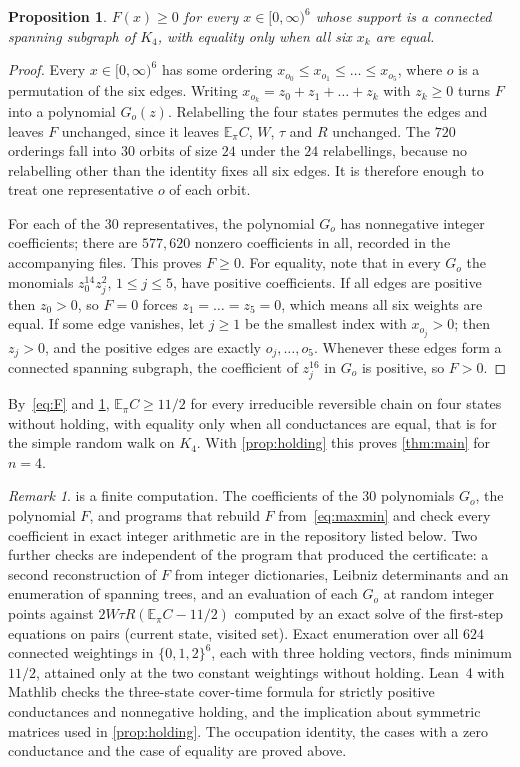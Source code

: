 \documentclass[11pt]{amsart}
\newtheorem{proposition}[theorem]{Proposition}
\theoremstyle{remark}
\newtheorem{remark}[theorem]{Remark}
\newcommand{\E}{\mathbb{E}}
\begin{document}
\begin{proposition}\label{prop:cones}
$F(x)\ge0$ for every $x\in[0,\infty)^6$ whose support is a connected spanning subgraph of $K_4$, with equality only
when all six $x_k$ are equal.
\end{proposition}

\begin{proof}
Every $x\in[0,\infty)^6$ has some ordering $x_{o_0}\le x_{o_1}\le\dots\le x_{o_5}$, where $o$ is a permutation of the
six edges. Writing $x_{o_k}=z_0+z_1+\dots+z_k$ with $z_k\ge0$ turns $F$ into a polynomial $G_o(z)$. Relabelling the
four states permutes the edges and leaves $F$ unchanged, since it leaves $\E_\pi C$, $W$, $\tau$ and $R$ unchanged. The
$720$ orderings fall into $30$ orbits of size $24$ under the $24$ relabellings, because no relabelling other than the
identity fixes all six edges. It is therefore enough to treat one representative $o$ of each orbit.

For each of the $30$ representatives, the polynomial $G_o$ has nonnegative integer coefficients; there are
$577{,}620$ nonzero coefficients in all, recorded in the accompanying files. This proves $F\ge0$. For equality, note that
in every $G_o$ the monomials $z_0^{14}z_j^2$, $1\le j\le5$, have positive coefficients. If all edges are positive then
$z_0>0$, so $F=0$ forces $z_1=\dots=z_5=0$, which means all six weights are equal. If some edge vanishes, let $j\ge1$ be
the smallest index with $x_{o_j}>0$; then $z_j>0$, and the positive edges are exactly $o_j,\dots,o_5$. Whenever these
edges form a connected spanning subgraph, the coefficient of $z_j^{16}$ in $G_o$ is positive, so $F>0$.
\end{proof}

By~\eqref{eq:F} and \cref{prop:cones}, $\E_\pi C\ge11/2$ for every irreducible reversible chain on four states without
holding, with equality only when all conductances are equal, that is for the simple random walk on $K_4$. With
\cref{prop:holding} this proves \cref{thm:main} for $n=4$.

\begin{remark}
 is a finite computation. The coefficients of the $30$ polynomials $G_o$, the polynomial $F$, and
programs that rebuild $F$ from~\eqref{eq:maxmin} and check every coefficient in exact integer arithmetic are in the
repository listed below. Two further checks are independent of the program that produced the certificate: a second
reconstruction of $F$ from integer dictionaries, Leibniz determinants and an enumeration of spanning trees, and an
evaluation of each $G_o$ at random integer points against $2W\tau R(\E_\pi C-11/2)$ computed by an exact solve of the
first-step equations on pairs (current state, visited set). Exact enumeration over all $624$ connected weightings in
$\{0,1,2\}^6$, each with three holding vectors, finds minimum $11/2$, attained only at the two constant weightings
without holding. Lean~4
with Mathlib checks the three-state cover-time formula for strictly positive conductances and nonnegative holding, and
the implication about symmetric matrices used in \cref{prop:holding}. The occupation identity, the cases with a zero
conductance and the case of equality are proved above.
\end{remark}
\end{document}
